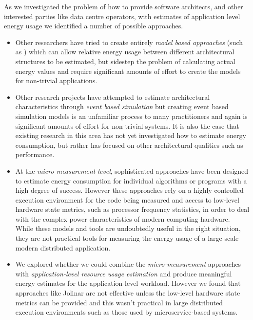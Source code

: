 As we investigated the problem of how to provide software architects, and other interested parties like data centre operators, with estimates of application level energy usage we identified a number of possible approaches.  

\begin{itemize}
\item Other researchers have tried to create entirely \emph{model based approaches} (such as \cite{seo2008-energystyle}) which can allow relative energy usage between different architectural structures to be estimated, but sidestep the problem of calculating actual energy values and require significant amounts of effort to create the models for non-trivial applications.

\item Other research projects have attempted to estimate architectural characteristics through \emph{event based simulation} \cite{grahn1998-energystyles} but creating event based simulation models is an unfamiliar process to many practitioners and again is significant amounts of effort for non-trivial systems.  It is also the case that existing research in this area has not yet investigated how to estimate energy consumption, but rather has focused on other architectural qualities such as performance.

\item At the \emph{micro-measurement level}, sophisticated approaches have been designed to estimate energy consumption for individual algorithms or programs \cite{noureddine2016-jolinar} with a high degree of success.  However these approaches rely on a highly controlled execution environment for the code being measured and access to low-level hardware state metrics, such as processor frequency statistics, in order to deal with the complex power characteristics of modern computing hardware.  While these models and tools are undoubtedly useful in the right situation, they are not practical tools for measuring the energy usage of a large-scale modern distributed application.

\item We explored whether we could combine the \emph{micro-measurement} approaches with \emph{application-level resource usage estimation} and produce meaningful energy estimates for the application-level workload.  However we found that approaches like Jolinar are not effective unless the low-level hardware state metrics can be provided and this wasn't practical in large distributed execution environments such as those used by microservice-based systems.

\end{itemize}

